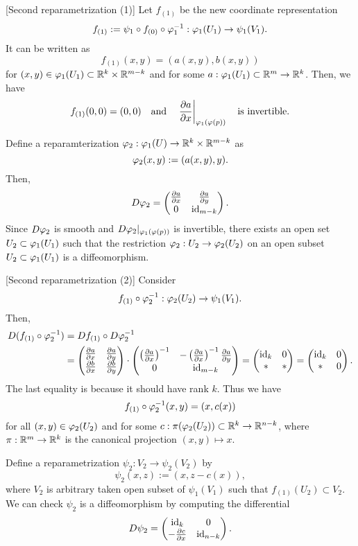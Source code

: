 \documentclass{../exp}
\begin{document}
\begin{pf}
[Second reparametrization (1)]
Let $f_{(1)}$ be the new coordinate representation
\[f_{(1)}:=\psi_1\o f_{(0)}\o\f_1^{-1}:\f_1(U_1)\to\psi_1(V_1).\]
It can be written as
\[f_{(1)}(x,y)=(a(x,y),b(x,y))\]
for $(x,y)\in\varphi_1(U_1)\subset\mathbb{R}^k\times\mathbb{R}^{m-k}$ and for some $a:\f_1(U_1)\subset\R^m\to\R^k$.
Then, we have
\[f_{(1)}(0,0)=(0,0)\quad\text{and}\quad\left.\pd{a}{x}\right|_{\f_1(\f(p))}\quad\text{is invertible.}\]

Define a reparamterization $\f_2:\f_1(U)\to\R^k\x\R^{m-k}$ as
\[\varphi_2(x,y):=(a(x,y),y).\]
Then,
\[D\f_2=\begin{pmatrix}\pd{a}{x}&\pd{a}{y}\\0&\id_{m-k}\end{pmatrix}.\]
Since $D\varphi_2$ is smooth and $D\varphi_2|_{\varphi_1(\varphi(p))}$ is invertible, there exists an open set $U_2\subset\varphi_1(U_1)$ such that the restriction $\f_2:U_2\to\f_2(U_2)$ on an open subset $U_2\subset\varphi_1(U_1)$ is a diffeomorphism.

[Second reparametrization (2)]
Consider
\[f_{(1)}\o\f_2^{-1}:\f_2(U_2)\to\psi_1(V_1).\]
Then,
\begin{align*}
D(f_{(1)}\o\f_2^{-1})
&=Df_{(1)}\o D\f_2^{-1}\\
&=\begin{pmatrix}\pd{a}{x}&\pd{a}{y}\\\pd{b}{x}&\pd{b}{y}\end{pmatrix}\cdot\begin{pmatrix}\left(\pd{a}{x}\right)^{-1}&-\left(\pd{a}{x}\right)^{-1}\pd{a}{y}\\0&\id_{m-k}\end{pmatrix}
=\begin{pmatrix}\id_k&0\\ * & * \end{pmatrix}
=\begin{pmatrix}\id_k&0\\ * &0\end{pmatrix}.
\end{align*}
The last equality is because it should have rank $k$.
Thus we have
\[f_{(1)}\o\f_2^{-1}(x,y)=(x,c(x))\]
for all $(x,y)\in\varphi_2(U_2)$ and for some $c:\pi(\f_2(U_2))\subset\R^k\to\R^{n-k}$, where $\pi:\R^m\to\R^k$ is the canonical projection $(x,y)\mapsto x$.

Define a reparametrization $\psi_2:V_2\to\psi_2(V_2)$ by
\[\psi_2(x,z):=(x,z-c(x)),\]
where $V_2$ is arbitrary taken open subset of $\psi_1(V_1)$ such that $f_{(1)}(U_2)\subset V_2$.
We can check $\psi_2$ is a diffeomorphism by computing the differential
\[D\psi_2=\begin{pmatrix}\id_k&0\\-\pd{c}{x}&\id_{n-k}\end{pmatrix}.\]


\end{pf}
\end{document}
